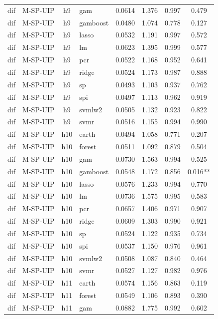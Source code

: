 \begin{ThreePartTable}
\begin{longtable}[t]{llclcccc}
dif & M-SP-UIP & h9 & gam & 0.0614 & 1.376 & 0.997 & 0.479\\
dif & M-SP-UIP & h9 & gamboost & 0.0480 & 1.074 & 0.778 & 0.127\\
dif & M-SP-UIP & h9 & lasso & 0.0532 & 1.191 & 0.997 & 0.572\\
dif & M-SP-UIP & h9 & lm & 0.0623 & 1.395 & 0.999 & 0.577\\
dif & M-SP-UIP & h9 & pcr & 0.0522 & 1.168 & 0.952 & 0.641\\
dif & M-SP-UIP & h9 & ridge & 0.0524 & 1.173 & 0.987 & 0.888\\
dif & M-SP-UIP & h9 & sp & 0.0493 & 1.103 & 0.937 & 0.762\\
dif & M-SP-UIP & h9 & spi & 0.0497 & 1.113 & 0.962 & 0.919\\
dif & M-SP-UIP & h9 & svmlw2 & 0.0505 & 1.132 & 0.923 & 0.822\\
dif & M-SP-UIP & h9 & svmr & 0.0516 & 1.155 & 0.994 & 0.990\\
\addlinespace
dif & M-SP-UIP & h10 & earth & 0.0494 & 1.058 & 0.771 & 0.207\\
dif & M-SP-UIP & h10 & forest & 0.0511 & 1.092 & 0.879 & 0.504\\
dif & M-SP-UIP & h10 & gam & 0.0730 & 1.563 & 0.994 & 0.525\\
dif & M-SP-UIP & h10 & gamboost & 0.0548 & 1.172 & 0.856 & 0.016**\\
dif & M-SP-UIP & h10 & lasso & 0.0576 & 1.233 & 0.994 & 0.770\\
dif & M-SP-UIP & h10 & lm & 0.0736 & 1.575 & 0.995 & 0.583\\
dif & M-SP-UIP & h10 & pcr & 0.0657 & 1.406 & 0.971 & 0.907\\
dif & M-SP-UIP & h10 & ridge & 0.0609 & 1.303 & 0.990 & 0.921\\
dif & M-SP-UIP & h10 & sp & 0.0524 & 1.122 & 0.935 & 0.734\\
dif & M-SP-UIP & h10 & spi & 0.0537 & 1.150 & 0.976 & 0.961\\
dif & M-SP-UIP & h10 & svmlw2 & 0.0508 & 1.087 & 0.840 & 0.464\\
dif & M-SP-UIP & h10 & svmr & 0.0527 & 1.127 & 0.982 & 0.976\\
\addlinespace
dif & M-SP-UIP & h11 & earth & 0.0574 & 1.156 & 0.863 & 0.119\\
dif & M-SP-UIP & h11 & forest & 0.0549 & 1.106 & 0.893 & 0.390\\
dif & M-SP-UIP & h11 & gam & 0.0882 & 1.775 & 0.992 & 0.602\\

\end{longtable}
\end{ThreePartTable}
